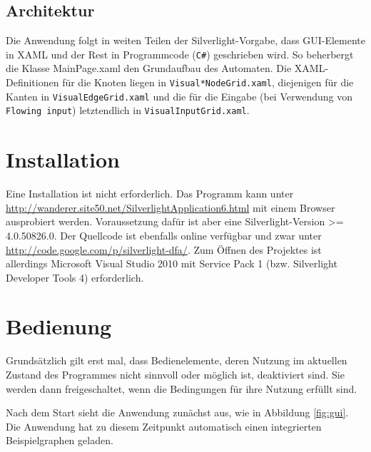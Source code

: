 \subsection{Architektur}

Die Anwendung folgt in weiten Teilen der Silverlight-Vorgabe, dass GUI-Elemente
in XAML und der Rest in Programmcode (\verb:C#:) geschrieben wird. So
beherbergt die Klasse MainPage.xaml den Grundaufbau des Automaten. Die
XAML-Definitionen für die Knoten liegen in \texttt{Visual*NodeGrid.xaml}, diejenigen für
die Kanten in \texttt{VisualEdgeGrid.xaml} und die für die Eingabe (bei Verwendung von
\texttt{Flowing input}) letztendlich in \texttt{VisualInputGrid.xaml}.

\section{Installation}


Eine Installation ist nicht erforderlich. Das Programm kann unter
\url{http://wanderer.site50.net/SilverlightApplication6.html} mit einem Browser
ausprobiert werden. Voraussetzung dafür ist aber eine Silverlight-Version >=
4.0.50826.0. Der Quellcode ist ebenfalls online verfügbar und zwar unter
\url{http://code.google.com/p/silverlight-dfa/}. Zum Öffnen des Projektes ist
allerdings Microsoft Visual Studio 2010 mit Service Pack 1 (bzw. Silverlight
Developer Tools 4) erforderlich.

\section{Bedienung}

Grundsätzlich gilt erst mal, dass Bedienelemente, deren Nutzung im aktuellen
Zustand des Programmes nicht sinnvoll oder möglich ist, deaktiviert sind. Sie
werden dann freigeschaltet, wenn die Bedingungen für ihre Nutzung erfüllt sind.

Nach dem Start sieht die Anwendung zunächst aus, wie in Abbildung \ref{fig:gui}. Die
Anwendung hat zu diesem Zeitpunkt automatisch einen integrierten
Beispielgraphen geladen.

